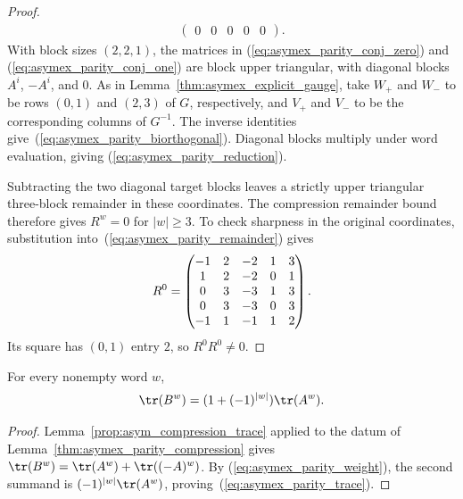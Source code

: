 \begin{proof}
\begin{align}
\begin{pmatrix}
             0 & 0 & 0  & 0  & 0
         \end{pmatrix}.
        \label{eq:asymex_parity_conj_one}
    \end{align}
    With block sizes $(2,2,1)$, the matrices in
    (\ref{eq:asymex_parity_conj_zero}) and
    (\ref{eq:asymex_parity_conj_one}) are block upper triangular,
    with diagonal blocks $A^i$, $-A^i$, and $0$.
    As in Lemma~\ref{thm:asymex_explicit_gauge}, take $W_+$ and
    $W_-$ to be rows $(0,1)$ and $(2,3)$ of $G$, respectively,
    and $V_+$ and $V_-$ to be the corresponding columns of $G^{-1}$.
    The inverse identities give~(\ref{eq:asymex_parity_biorthogonal}).
    Diagonal blocks multiply under word evaluation, giving
    (\ref{eq:asymex_parity_reduction}).

    Subtracting the two diagonal target blocks leaves a strictly
    upper triangular three-block remainder in these coordinates.
    The compression remainder bound therefore gives $R^w=0$
    for $|w|\geq3$. To check sharpness in the original coordinates,
    substitution into~(\ref{eq:asymex_parity_remainder}) gives
    \begin{align}
        R^0=\begin{pmatrix}
                -1 & 2 & -2 & 1 & 3 \\
                1  & 2 & -2 & 0 & 1 \\
                0  & 3 & -3 & 1 & 3 \\
                0  & 3 & -3 & 0 & 3 \\
                -1 & 1 & -1 & 1 & 2
            \end{pmatrix}.
        \notag
    \end{align}
    Its square has $(0,1)$ entry $2$, so $R^0R^0\neq0$.
\end{proof}

\begin{lemma}
    \label{thm:asymex_parity_trace}
    \leanok
    For every nonempty word $w$,
    \begin{align}
        \tr(B^w)=(1+(-1)^{|w|})\tr(A^w).
        \label{eq:asymex_parity_trace}
    \end{align}
\end{lemma}

\begin{proof}
    \leanok
    Lemma~\ref{prop:asym_compression_trace} applied to the datum of
    Lemma~\ref{thm:asymex_parity_compression} gives
    $\tr(B^w)=\tr(A^w)+\tr((-A)^w)$. By
    (\ref{eq:asymex_parity_weight}), the second summand is
    $(-1)^{|w|}\tr(A^w)$, proving~(\ref{eq:asymex_parity_trace}).
\end{proof}

